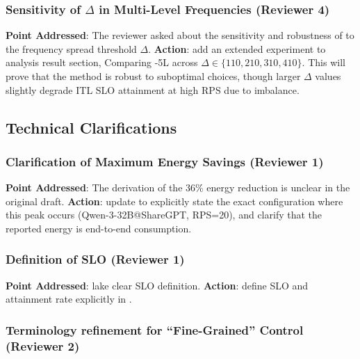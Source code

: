
\subsubsection{Sensitivity of $\Delta$ in Multi-Level Frequencies (Reviewer 4)}

\textbf{Point Addressed}: The reviewer asked about the sensitivity and robustness of \router to the frequency spread threshold $\Delta$.
\textbf{Action}: add an extended experiment to analysis result section, Comparing \name-5L across $\Delta \in \{110, 210, 310, 410\}$. This will prove that the method is robust to suboptimal choices, though larger $\Delta$ values slightly degrade ITL SLO attainment at high RPS due to imbalance.


\subsection{Technical Clarifications}

\subsubsection{Clarification of Maximum Energy Savings (Reviewer 1)}

\textbf{Point Addressed}: The derivation of the 36\% energy reduction is unclear in the original draft.
\textbf{Action}: update  to explicitly state the exact configuration where this peak occurs (Qwen-3-32B@ShareGPT, RPS=20), and clarify that the reported energy is end-to-end consumption. 

\subsubsection{Definition of SLO (Reviewer 1)}

\textbf{Point Addressed}: lake clear SLO definition.
\textbf{Action}: define SLO and attainment rate explicitly in .

\subsubsection{Terminology refinement for ``Fine-Grained'' Control (Reviewer 2)}

